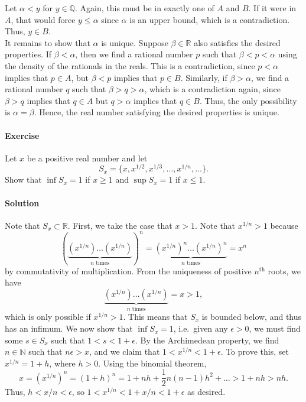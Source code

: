 \documentclass[10pt]{article}
\newcounter{prob}
\def\problem{\stepcounter{prob}\paragraph{Exercise \arabic{prob}}}
\def\solution{\paragraph{Solution}}
\begin{document}
        Let $\alpha < y$ for $y \in \mathbb{Q}$. Again, this must be in exactly one of $A$ and $B$. If it were in $A$, that would
        force $y \leq \alpha$ since $\alpha$ is an upper bound, which is a contradiction. Thus, $y \in B$. \\

        It remains to show that $\alpha$ is unique. Suppose $\beta \in \mathbb{R}$ also satisfies the desired properties.
        If $\beta < \alpha$, then we find a rational number $p$ such that $\beta < p < \alpha$ using the density of the rationals in the reals.
        This is a contradiction, since $p < \alpha$ implies that $p \in A$, but $\beta < p$ implies that $p \in B$.
        Similarly, if $\beta > \alpha$, we find a rational number $q$ such that $\beta > q > \alpha$, which is a contradiction again,
        since $\beta > q$ implies that $q \in A$ but $q > \alpha$ implies that $q \in B$.
        Thus, the only possibility is $\alpha = \beta$. Hence, the real number satisfying the desired properties is unique.


        \problem Let $x$ be a positive real number and let 
        \[
                S_x = \{x, x^{1 /2}, x^{1 /3}, \dots, x^{1 /n}, \dots\}.
        \]
        Show that $\inf{S_x} = 1$ if $x \geq 1$ and $\sup{S_x} = 1$ if $x \leq 1$.

        \solution Note that $S_x \subset \mathbb{R}$. First, we take the case that $x > 1$.
        Note that $x^{1 /n} > 1$ because
        \[
                \left(\underbrace{(x^{1 /n})\dots(x^{1 /n})}_{n \text{ times}}\right)^n =
                \underbrace{(x^{1 /n})^n\dots(x^{1 /n})^n}_{n \text{ times}} = x^n
        \] by commutativity of multiplication. From the uniqueness of positive $n^\text{th}$ roots, we have
        \[
                \underbrace{(x^{1 /n})\dots(x^{1 /n})}_{n\text{ times}} = x > 1,
        \]
        which is only possible if $x^{1 /n} > 1$. This means that $S_x$ is bounded below, and thus has an infimum. We now show that $\inf{S_x} = 1$,
        i.e.\ given any $\epsilon > 0$, we must find some $s \in S_x$ such that $1 < s < 1 + \epsilon$.
        By the Archimedean property, we find $n \in \mathbb{N}$ such that $n\epsilon > x$, and we claim that $1 < x^{1 /n} < 1 + \epsilon$.
        To prove this, set $x^{1 /n} = 1 + h$, where $h > 0$. Using the binomial theorem,
        \[
                x = (x^{1 /n})^n = (1 + h)^n = 1 + nh + \frac{1}{2}n(n-1)h^2 + \dots > 1 + nh > nh.
        \]
        Thus, $h < x/n < \epsilon$, so $1 < x^{1 /n} < 1 + x/n < 1 + \epsilon$ as desired. \\
\end{document}
